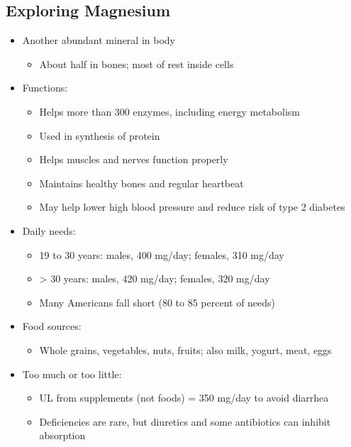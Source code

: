 \documentclass[12pt]{article}
\begin{document}
        \subsection{Exploring Magnesium}
            \begin{itemize}
                \item Another abundant mineral in body
                    \begin{itemize}
                        \item About half in bones; most of rest inside cells
                    \end{itemize}
                \item Functions:
                    \begin{itemize}
                        \item Helps more than 300 enzymes, including energy metabolism
                        \item Used in synthesis of protein
                        \item Helps muscles and nerves function properly
                        \item Maintains healthy bones and regular heartbeat
                        \item May help lower high blood pressure and reduce risk of type 2 diabetes
                    \end{itemize}
                \item Daily needs:
                    \begin{itemize}
                        \item 19 to 30 years: males, 400 mg/day; females, 310 mg/day
                        \item > 30 years: males, 420 mg/day; females, 320 mg/day
                        \item Many Americans fall short (80 to 85 percent of needs)
                    \end{itemize}
                \item Food sources:
                    \begin{itemize}
                        \item Whole grains, vegetables, nuts, fruits; also milk, yogurt, meat, eggs
                    \end{itemize}
                \item Too much or too little:
                    \begin{itemize}
                        \item UL from supplements (not foods) = 350 mg/day to avoid diarrhea
                        \item Deficiencies are rare, but diuretics and some antibiotics can inhibit absorption
                    \end{itemize}
            \end{itemize}
\end{document}
